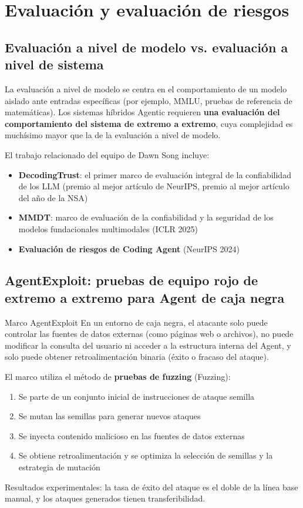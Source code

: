\section{Evaluación y evaluación de riesgos}

\subsection{Evaluación a nivel de modelo vs. evaluación a nivel de sistema}

La evaluación a nivel de modelo se centra en el comportamiento de un modelo aislado ante entradas específicas (por ejemplo, MMLU, pruebas de referencia de matemáticas). Los sistemas híbridos Agentic requieren \textbf{una evaluación del comportamiento del sistema de extremo a extremo}, cuya complejidad es muchísimo mayor que la de la evaluación a nivel de modelo.

El trabajo relacionado del equipo de Dawn Song incluye:
\begin{itemize}
    \item \textbf{DecodingTrust}: el primer marco de evaluación integral de la confiabilidad de los LLM (premio al mejor artículo de NeurIPS, premio al mejor artículo del año de la NSA)
    \item \textbf{MMDT}: marco de evaluación de la confiabilidad y la seguridad de los modelos fundacionales multimodales (ICLR 2025)
    \item \textbf{Evaluación de riesgos de Coding Agent} (NeurIPS 2024)
\end{itemize}

\subsection{AgentExploit: pruebas de equipo rojo de extremo a extremo para Agent de caja negra}

\begin{importantbox}{Marco AgentExploit}
En un entorno de caja negra, el atacante solo puede controlar las fuentes de datos externas (como páginas web o archivos), no puede modificar la consulta del usuario ni acceder a la estructura interna del Agent, y solo puede obtener retroalimentación binaria (éxito o fracaso del ataque).

El marco utiliza el método de \textbf{pruebas de fuzzing} (Fuzzing):
\begin{enumerate}
    \item Se parte de un conjunto inicial de instrucciones de ataque semilla
    \item Se mutan las semillas para generar nuevos ataques
    \item Se inyecta contenido malicioso en las fuentes de datos externas
    \item Se obtiene retroalimentación y se optimiza la selección de semillas y la estrategia de mutación
\end{enumerate}
Resultados experimentales: la tasa de éxito del ataque es el doble de la línea base manual, y los ataques generados tienen transferibilidad.
\end{importantbox}

